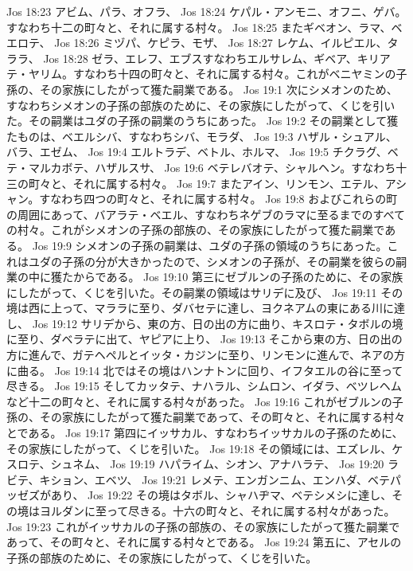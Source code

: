 Jos 18:23  アビム、パラ、オフラ、
Jos 18:24  ケパル・アンモニ、オフニ、ゲバ。すなわち十二の町々と、それに属する村々。
Jos 18:25  またギベオン、ラマ、ベエロテ、
Jos 18:26  ミヅパ、ケピラ、モザ、
Jos 18:27  レケム、イルピエル、タララ、
Jos 18:28  ゼラ、エレフ、エブスすなわちエルサレム、ギベア、キリアテ・ヤリム。すなわち十四の町々と、それに属する村々。これがベニヤミンの子孫の、その家族にしたがって獲た嗣業である。
Jos 19:1  次にシメオンのため、すなわちシメオンの子孫の部族のために、その家族にしたがって、くじを引いた。その嗣業はユダの子孫の嗣業のうちにあった。
Jos 19:2  その嗣業として獲たものは、ベエルシバ、すなわちシバ、モラダ、
Jos 19:3  ハザル・シュアル、バラ、エゼム、
Jos 19:4  エルトラデ、ベトル、ホルマ、
Jos 19:5  チクラグ、ベテ・マルカボテ、ハザルスサ、
Jos 19:6  ベテレバオテ、シャルヘン。すなわち十三の町々と、それに属する村々。
Jos 19:7  またアイン、リンモン、エテル、アシャン。すなわち四つの町々と、それに属する村々。
Jos 19:8  およびこれらの町の周囲にあって、バアラテ・ベエル、すなわちネゲブのラマに至るまでのすべての村々。これがシメオンの子孫の部族の、その家族にしたがって獲た嗣業である。
Jos 19:9  シメオンの子孫の嗣業は、ユダの子孫の領域のうちにあった。これはユダの子孫の分が大きかったので、シメオンの子孫が、その嗣業を彼らの嗣業の中に獲たからである。
Jos 19:10  第三にゼブルンの子孫のために、その家族にしたがって、くじを引いた。その嗣業の領域はサリデに及び、
Jos 19:11  その境は西に上って、マララに至り、ダバセテに達し、ヨクネアムの東にある川に達し、
Jos 19:12  サリデから、東の方、日の出の方に曲り、キスロテ・タボルの境に至り、ダベラテに出て、ヤピアに上り、
Jos 19:13  そこから東の方、日の出の方に進んで、ガテヘペルとイッタ・カジンに至り、リンモンに進んで、ネアの方に曲る。
Jos 19:14  北ではその境はハンナトンに回り、イフタエルの谷に至って尽きる。
Jos 19:15  そしてカッタテ、ナハラル、シムロン、イダラ、ベツレヘムなど十二の町々と、それに属する村々があった。
Jos 19:16  これがゼブルンの子孫の、その家族にしたがって獲た嗣業であって、その町々と、それに属する村々とである。
Jos 19:17  第四にイッサカル、すなわちイッサカルの子孫のために、その家族にしたがって、くじを引いた。
Jos 19:18  その領域には、エズレル、ケスロテ、シュネム、
Jos 19:19  ハパライム、シオン、アナハラテ、
Jos 19:20  ラビテ、キション、エベツ、
Jos 19:21  レメテ、エンガンニム、エンハダ、ベテパッゼズがあり、
Jos 19:22  その境はタボル、シャハヂマ、ベテシメシに達し、その境はヨルダンに至って尽きる。十六の町々と、それに属する村々があった。
Jos 19:23  これがイッサカルの子孫の部族の、その家族にしたがって獲た嗣業であって、その町々と、それに属する村々とである。
Jos 19:24  第五に、アセルの子孫の部族のために、その家族にしたがって、くじを引いた。
